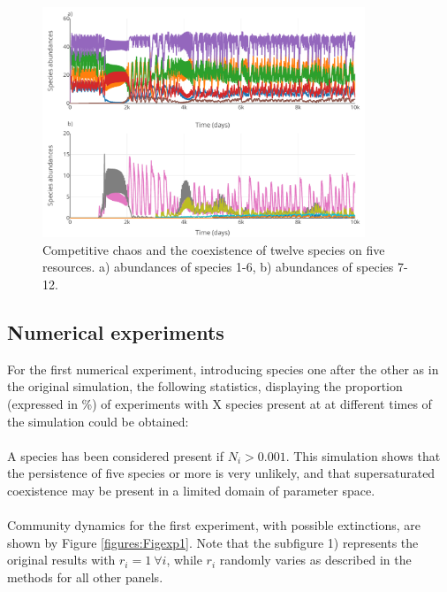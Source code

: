 \begin{figure}[H]
\begin{center} 
 \includegraphics[width=0.86\textwidth]{../Code/Figures/Figure_4.pdf}
  \caption{Competitive chaos and the coexistence of twelve species on five resources. a) abundances of species 1-6, b) abundances of species 7-12. }
  \label{figures:Fig4}
\end{center}
  \end{figure}

\subsection{Numerical experiments}

For the first numerical experiment, introducing species one after the other as in the original simulation, the following statistics, displaying the proportion (expressed in \%) of experiments with X species present at at different times of the simulation could be obtained: \\

\\
A species has been considered present if $N_i > 0.001$. This simulation shows that the persistence of five species or more is very unlikely, and that supersaturated coexistence may be present in a limited domain of parameter space.\\
\\
Community dynamics for the first experiment, with possible extinctions, are shown by Figure \ref{figures:Figexp1}. Note that the subfigure 1) represents the original results with $r_i=1 ~\forall i$, while $r_i$ randomly varies as described in the methods for all other panels. 

